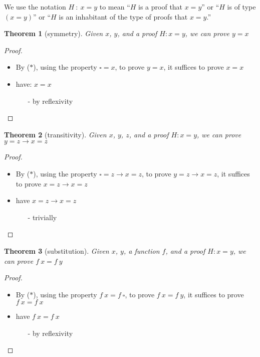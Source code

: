 \documentclass{article}
\newtheorem*{thm*}{Theorem}
\theoremstyle{definition}
\begin{document}
We use the notation $H~:~x = y$ to mean ``$H$ is a proof that $x = y$'' or ``$H$ is of type $(x = y)$'' or ``$H$ is an inhabitant of the type of proofs that $x = y$.''

{\setlength{\parskip}{0pt}%
\begin{thm*}[symmetry]
Given $x$, $y$, and a proof $H : x = y$, we can prove $y = x$
\end{thm*}
\begin{proof}
$\left.\right.$\\
\begin{itemize}
  \item By ($\ast$), using the property $\square = x$, to prove $y = x$, it suffices to prove $x = x$
  \item have: $x = x$
  \begin{itemize}
    \item[-] by reflexivity
  \end{itemize}
\end{itemize}
\end{proof}
\begin{thm*}[transitivity]
Given $x$, $y$, $z$, and a proof $H : x = y$, we can prove $y = z \to x = z$
\end{thm*}
\begin{proof}
$\left.\right.$\\
\begin{itemize}
  \item By ($\ast$), using the property $\square = z \to x = z$, to prove $y = z \to x = z$, it suffices to prove $x = z \to x = z$
  \item have $x = z \to x = z$
  \begin{itemize}
    \item[-] trivially
  \end{itemize}
\end{itemize}
\end{proof}
\begin{thm*}[substitution]
Given $x$, $y$, a function $f$, and a proof $H : x = y$, we can prove $f~x = f~y$
\end{thm*}
\begin{proof}
$\left.\right.$\\
\begin{itemize}
  \item By ($\ast$), using the property $f~x = f~\square$, to prove $f~x = f~y$, it suffices to prove $f~x = f~x$
  \item have $f~x = f~x$
  \begin{itemize}
    \item[-] by reflexivity
  \end{itemize}
\end{itemize}
\end{proof}
}
\end{document}
